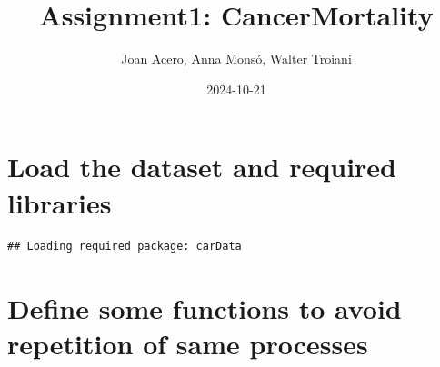\documentclass[
]{article}
\title{Assignment1: CancerMortality}
\author{Joan Acero, Anna Monsó, Walter Troiani}
\date{2024-10-21}
\newenvironment{Shaded}{\begin{snugshade}}{\end{snugshade}}
\newcommand{\AttributeTok}[1]{\textcolor[rgb]{0.13,0.29,0.53}{#1}}
\newcommand{\CommentTok}[1]{\textcolor[rgb]{0.56,0.35,0.01}{\textit{#1}}}
\newcommand{\FunctionTok}[1]{\textcolor[rgb]{0.13,0.29,0.53}{\textbf{#1}}}
\newcommand{\NormalTok}[1]{#1}
\newcommand{\OtherTok}[1]{\textcolor[rgb]{0.56,0.35,0.01}{#1}}
\newcommand{\SpecialCharTok}[1]{\textcolor[rgb]{0.81,0.36,0.00}{\textbf{#1}}}
\newcommand{\StringTok}[1]{\textcolor[rgb]{0.31,0.60,0.02}{#1}}
\begin{document}
\maketitle

{
\setcounter{tocdepth}{2}
\tableofcontents
}
\newpage

\section{Load the dataset and required
libraries}\label{load-the-dataset-and-required-libraries}

\begin{Shaded}
\end{Shaded}

\begin{verbatim}
## Loading required package: carData
\end{verbatim}

\section{Define some functions to avoid repetition of same
processes}\label{define-some-functions-to-avoid-repetition-of-same-processes}
\end{document}
